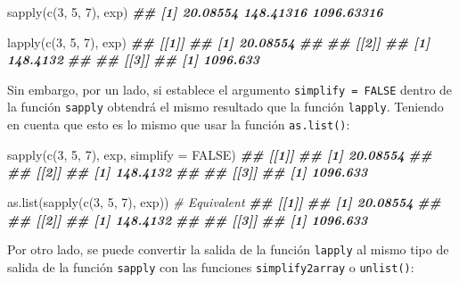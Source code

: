 \documentclass[
]{book}
\newenvironment{Shaded}{\begin{snugshade}}{\end{snugshade}}
\newcommand{\AttributeTok}[1]{\textcolor[rgb]{0.77,0.63,0.00}{#1}}
\newcommand{\CommentTok}[1]{\textcolor[rgb]{0.56,0.35,0.01}{\textit{#1}}}
\newcommand{\ConstantTok}[1]{\textcolor[rgb]{0.00,0.00,0.00}{#1}}
\newcommand{\DecValTok}[1]{\textcolor[rgb]{0.00,0.00,0.81}{#1}}
\newcommand{\DocumentationTok}[1]{\textcolor[rgb]{0.56,0.35,0.01}{\textbf{\textit{#1}}}}
\newcommand{\FunctionTok}[1]{\textcolor[rgb]{0.00,0.00,0.00}{#1}}
\newcommand{\NormalTok}[1]{#1}
\begin{document}
\begin{Shaded}
\begin{Highlighting}[]
\FunctionTok{sapply}\NormalTok{(}\FunctionTok{c}\NormalTok{(}\DecValTok{3}\NormalTok{, }\DecValTok{5}\NormalTok{, }\DecValTok{7}\NormalTok{), exp)}
\DocumentationTok{\#\# [1]   20.08554  148.41316 1096.63316}

\FunctionTok{lapply}\NormalTok{(}\FunctionTok{c}\NormalTok{(}\DecValTok{3}\NormalTok{, }\DecValTok{5}\NormalTok{, }\DecValTok{7}\NormalTok{), exp)}
\DocumentationTok{\#\# [[1]]}
\DocumentationTok{\#\# [1] 20.08554}
\DocumentationTok{\#\# }
\DocumentationTok{\#\# [[2]]}
\DocumentationTok{\#\# [1] 148.4132}
\DocumentationTok{\#\# }
\DocumentationTok{\#\# [[3]]}
\DocumentationTok{\#\# [1] 1096.633}
\end{Highlighting}
\end{Shaded}

Sin embargo, por un lado, si establece el argumento \texttt{simplify\ =\ FALSE} dentro de la función \texttt{sapply} obtendrá el mismo resultado que la función \texttt{lapply}. Teniendo en cuenta que esto es lo mismo que usar la función \texttt{as.list()}:

\begin{Shaded}
\begin{Highlighting}[]
\FunctionTok{sapply}\NormalTok{(}\FunctionTok{c}\NormalTok{(}\DecValTok{3}\NormalTok{, }\DecValTok{5}\NormalTok{, }\DecValTok{7}\NormalTok{), exp, }\AttributeTok{simplify =} \ConstantTok{FALSE}\NormalTok{)}
\DocumentationTok{\#\# [[1]]}
\DocumentationTok{\#\# [1] 20.08554}
\DocumentationTok{\#\# }
\DocumentationTok{\#\# [[2]]}
\DocumentationTok{\#\# [1] 148.4132}
\DocumentationTok{\#\# }
\DocumentationTok{\#\# [[3]]}
\DocumentationTok{\#\# [1] 1096.633}

\FunctionTok{as.list}\NormalTok{(}\FunctionTok{sapply}\NormalTok{(}\FunctionTok{c}\NormalTok{(}\DecValTok{3}\NormalTok{, }\DecValTok{5}\NormalTok{, }\DecValTok{7}\NormalTok{), exp)) }\CommentTok{\# Equivalent}
\DocumentationTok{\#\# [[1]]}
\DocumentationTok{\#\# [1] 20.08554}
\DocumentationTok{\#\# }
\DocumentationTok{\#\# [[2]]}
\DocumentationTok{\#\# [1] 148.4132}
\DocumentationTok{\#\# }
\DocumentationTok{\#\# [[3]]}
\DocumentationTok{\#\# [1] 1096.633}
\end{Highlighting}
\end{Shaded}

Por otro lado, se puede convertir la salida de la función \texttt{lapply} al mismo tipo de salida de la función \texttt{sapply} con las funciones \texttt{simplify2array} o \texttt{unlist()}:
\end{document}

